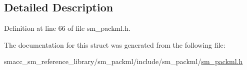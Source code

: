 \subsection{Detailed Description}


Definition at line 66 of file sm\+\_\+packml.\+h.



The documentation for this struct was generated from the following file\+:\begin{DoxyCompactItemize}
\item 
smacc\+\_\+sm\+\_\+reference\+\_\+library/sm\+\_\+packml/include/sm\+\_\+packml/\hyperlink{sm__packml_8h}{sm\+\_\+packml.\+h}\end{DoxyCompactItemize}
